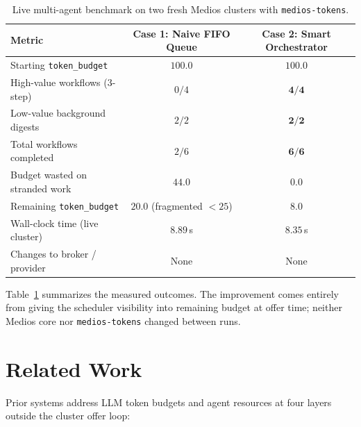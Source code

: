 \documentclass[11pt]{article}
\begin{document}
\begin{table}[t]
\centering
\small
\begin{tabular}{@{}lcc@{}}
\toprule
\textbf{Metric} & \textbf{Case 1: Naive FIFO Queue} & \textbf{Case 2: Smart Orchestrator} \\
\midrule
Starting \texttt{token\_budget} & $100.0$ & $100.0$ \\
High-value workflows (3-step) & $0 / 4$ & $\mathbf{4 / 4}$ \\
Low-value background digests & $2 / 2$ & $\mathbf{2 / 2}$ \\
Total workflows completed & $2 / 6$ & $\mathbf{6 / 6}$ \\
Budget wasted on stranded work & $44.0$ & $\mathbf{0.0}$ \\
Remaining \texttt{token\_budget} & $20.0$ (fragmented $< 25$) & $8.0$ \\
Wall-clock time (live cluster) & $8.89$\,s & $\mathbf{8.35}$\,s \\
Changes to broker / provider & None & None \\
\bottomrule
\end{tabular}
\caption{Live multi-agent benchmark on two fresh Medios clusters with \texttt{medios-tokens}.}
\label{tab:bench}
\end{table}

Table~\ref{tab:bench} summarizes the measured outcomes. The improvement comes entirely from giving the scheduler visibility into remaining budget at offer time; neither Medios core nor \texttt{medios-tokens} changed between runs.

\section{Related Work}
\label{sec:related}

Prior systems address LLM token budgets and agent resources at four layers outside the cluster offer loop:
\end{document}
